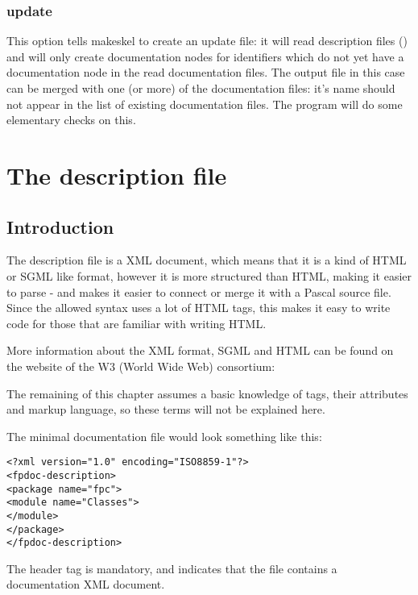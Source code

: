 \subsection{update}
\label{suse:update}
This option tells makeskel to create an update file: it will read
description files () and will only create documentation nodes
for identifiers which do not yet have a documentation node in the read
documentation files. The output file in this case can be merged with one (or
more) of the documentation files: it's name should not appear in the list of
existing documentation files. The  program will do some
elementary checks on this.

\chapter{The description file}
\label{ch:descriptionfile}

\section{Introduction}
The description file is a XML document, which means that it is a kind of
HTML or SGML like format, however it is more structured than HTML, making it
easier to parse - and makes it easier to connect or merge it with a Pascal
source file. Since the allowed syntax uses a lot of HTML tags, this makes 
it easy to write code for those that are familiar with writing HTML.

More information about the XML format, SGML and HTML can be found on the 
website of the W3 (World Wide Web) consortium:  

The remaining of this chapter assumes a basic knowledge of tags, their
attributes and markup language, so these terms will not be explained here. 

The minimal documentation file would look something like this:
\begin{verbatim}
<?xml version="1.0" encoding="ISO8859-1"?>
<fpdoc-description>
<package name="fpc">
<module name="Classes">
</module>
</package>
</fpdoc-description>
\end{verbatim}
The header  tag is mandatory, and indicates that the file contains a
documentation XML document.

